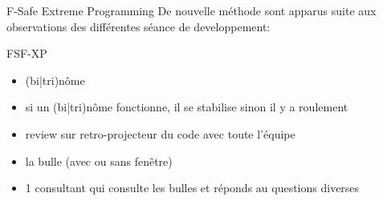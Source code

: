 {
%
\begin{frame}{F-Safe Extreme Programming}
  De nouvelle méthode sont apparus suite aux observations des différentes séance de developpement:
  \begin{exampleblock}{FSF-XP}
    \begin{itemize}
    \item (bi|tri)nôme
    \item si un (bi|tri)nôme fonctionne, il se stabilise sinon il y a roulement
    \item review sur retro-projecteur du code avec toute l'équipe
    \item la bulle (avec ou sans fenêtre)
    \item 1 consultant qui consulte les bulles et réponds au questions diverses
    \end{itemize}
  \end{exampleblock}
\end{frame}
}

